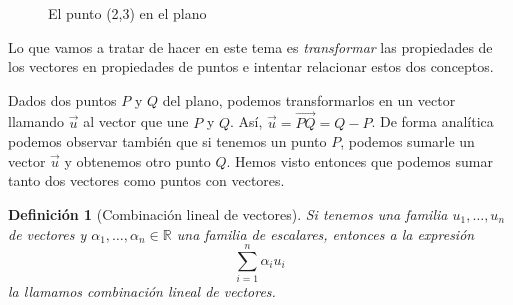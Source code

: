 \documentclass[11pt, a4paper]{article}
\newif\IfInSansMode
\let\oldsf\sffamily
\renewcommand*{\sffamily}{\oldsf\mathversion{sans}\InSansModetrue}
\newcommand{\R}{\mathbb{R}}
\renewcommand{\vec}{\overrightarrow}
\theoremstyle{theorem-style}
\theoremstyle{definition-style}
\newtheorem{ndef}{Definición}[section]
\theoremstyle{remark-style}
\theoremstyle{example-style}
\begin{document}
\begin{figure*}[h]
	\sffamily
  \centering
  \caption{El punto (2,3) en el plano}
\end{figure*}

Lo que vamos a tratar de hacer en este tema es \textit{transformar} las propiedades de los vectores en propiedades de puntos e intentar relacionar estos dos conceptos.

\begin{minipage}[b]{0.45\textwidth}
  Dados dos puntos $P$ y $Q$ del plano, podemos transformarlos en un vector llamando $\vec{u}$ al vector que une $P$ y $Q$. Así, $\vec{u} = \overrightarrow{PQ} = Q-P$. De forma analítica podemos observar también que si tenemos un punto $P$, podemos sumarle un vector $\vec{u}$ y obtenemos otro punto $Q$. Hemos visto entonces que podemos sumar tanto dos     vectores como puntos con vectores.
\end{minipage} \hfill
\begin{minipage}[b]{0.45\textwidth}
\end{minipage}
\begin{ndef}[Combinación lineal de vectores]
  Si tenemos una familia $u_1,\ldots , u_n$ de vectores y $\alpha_1,\ldots, \alpha_n \in \R$ una familia de escalares, entonces a la expresión
  \[
    \sum_{i=1}^n \alpha_i u_i
  \]
  la llamamos \textit{combinación lineal de vectores}.
\end{ndef}
\end{document}
